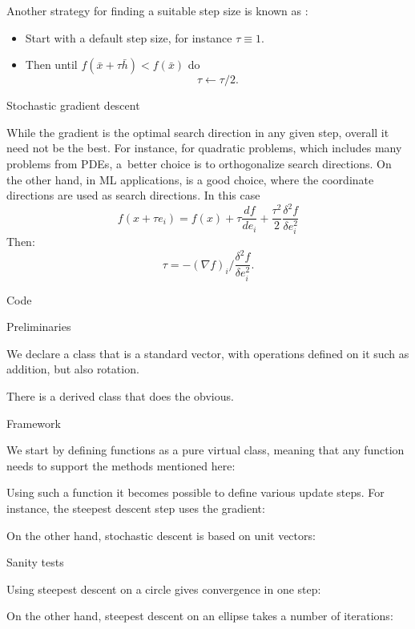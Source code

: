 Another strategy for finding a suitable step size is known as
:
\begin{itemize}
\item Start with a default step size, for instance $\tau\equiv1$.
\item Then until $f(\bar x+\tau\bar h)<f(\bar x)$ do
  \[ \tau\leftarrow\tau/2. \]
\end{itemize}

 {Stochastic gradient descent}

While the gradient is the optimal search direction in any given step,
overall it need not be the best. For instance, for quadratic problems,
which includes many problems from \acp{PDE}, a~better choice is to
orthogonalize search directions. On the other hand, in \ac{ML}
applications,  is a good choice, where the coordinate
directions are used as search directions. In this case
\[ f(x+\tau e_i) = f(x) + \tau \frac{df}{de_i} +
\frac{\tau^2}2 \frac{\delta^2f}{\delta e_i^2} \]
Then:
\[ \tau = - (\nabla f)_i / \frac{ \delta^2 f }{ \delta e_i^2 }. \]

 {Code}

 {Preliminaries}

We declare a  class that is a standard vector, with
operations defined on it such as addition, but also rotation.

There is a derived class  that does the obvious.

 {Framework}

We start by defining functions as a pure virtual class, meaning that
any function needs to support the methods mentioned here:


Using such a function it becomes possible to define various update
steps. For instance, the steepest descent step uses the gradient:


On the other hand, stochastic descent is based on unit vectors:


 {Sanity tests}

Using steepest descent on a circle gives convergence in one step:
%

On the other hand, steepest descent on an ellipse takes a number of
iterations:
%

